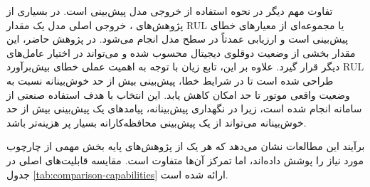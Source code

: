 \documentclass[a4paper,fleqn]{report}
\begin{document}
تفاوت مهم دیگر در نحوه استفاده از خروجی مدل پیش‌بینی است. در بسیاری
از پژوهش‌های ، خروجی اصلی مدل یک مقدار \gls{RUL} یا مجموعه‌ای از
معیارهای خطای پیش‌بینی است و ارزیابی عمدتاً در سطح مدل انجام می‌شود.
در پژوهش حاضر، این مقدار بخشی از وضعیت دوقلوی دیجیتال محسوب شده و
می‌تواند در اختیار عامل‌های دیگر قرار گیرد. علاوه بر این، تابع زیان
با توجه به اهمیت عملی خطای بیش‌برآورد \gls{RUL} طراحی شده است تا در شرایط
خطا، پیش‌بینی بیش از حد خوش‌بینانه نسبت به وضعیت واقعی موتور تا حد
امکان کاهش یابد. این انتخاب با هدف استفاده صنعتی از سامانه انجام شده
است، زیرا در نگهداری پیش‌بینانه، پیامدهای یک پیش‌بینی بیش از حد
خوش‌بینانه می‌تواند از یک پیش‌بینی محافظه‌کارانه بسیار پر هزینه‌‌تر باشد.

برآیند این مطالعات نشان می‌دهد که هر یک از پژوهش‌های پایه بخش مهمی
از چارچوب مورد نیاز را پوشش داده‌اند، اما تمرکز آن‌ها متفاوت است.
مقایسه قابلیت‌های اصلی در جدول \ref{tab:comparison-capabilities}
ارائه شده است.
\end{document}
